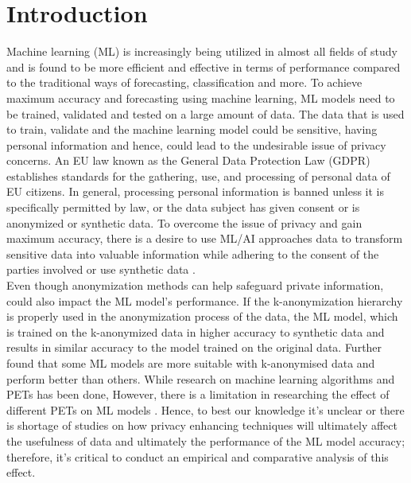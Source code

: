 \section{Introduction}
\label{sec:introduction}
Machine learning (ML) is increasingly being utilized in almost all fields of study and is found to be more efficient and effective in terms of performance compared to the traditional ways of forecasting, classification and more. To achieve maximum accuracy and forecasting using machine learning, ML models need to be trained, validated and tested on a large amount of data. The data that is used to train, validate and  the machine learning model could be sensitive, having personal information and hence, could lead to the undesirable issue of privacy concerns. An EU law known as the General Data Protection Law (GDPR) establishes standards for the gathering, use, and processing of personal data of EU citizens. In general, processing personal information is banned unless it is specifically permitted by law, or the data subject has given consent or is anonymized or synthetic data\cite{Einwilligung}. To overcome the issue of privacy and gain maximum accuracy, there is a desire to use ML/AI approaches data to transform sensitive data into valuable information while adhering to the consent of the parties involved or use synthetic data \cite{soykan2022survey}. \\
Even though anonymization methods can help safeguard private information, could also impact the ML model's performance. If the k-anonymization hierarchy is properly used in the anonymization process of the data, the ML model, which is trained on the k-anonymized data in higher accuracy to synthetic data and results in similar accuracy to the model trained on the original data\cite{oprescu2022energy}. Further \cite{hoyos2020contribution} found that some ML models are more suitable with k-anonymised data and perform better than others. While research on machine learning algorithms and PETs has been done, However, there is a limitation in researching the effect of different PETs on ML models \cite{hoyos2020contribution}. Hence, to best our knowledge it's unclear or there is shortage of studies on how privacy enhancing techniques will ultimately affect the usefulness of data and ultimately the performance of the ML model accuracy; therefore, it's critical to conduct an empirical and comparative analysis of this effect.\\
